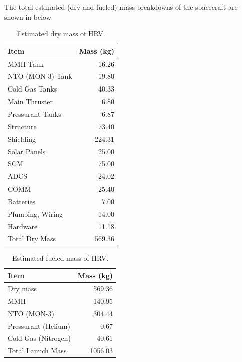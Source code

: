 \documentclass[paper=letter, fontsize=11pt]{scrartcl} %
\numberwithin{equation}{section} %
\numberwithin{figure}{section} %
\numberwithin{table}{section} %
\begin{document}
The total estimated (dry and fueled) mass breakdowns of the spacecraft are shown in below

\begin{table}[H]
  \centering
  \begin{tabular}{l r}
    \toprule
    Item             & Mass (kg) \\
    \midrule
    MMH Tank         & 16.26     \\
    NTO (MON-3) Tank & 19.80     \\
    Cold Gas Tanks   & 40.33     \\
    Main Thruster    & 6.80      \\
    Pressurant Tanks & 6.87      \\
    Structure        & 73.40     \\
    Shielding        & 224.31    \\
    Solar Panels     & 25.00     \\
    SCM              & 75.00     \\
    ADCS             & 24.02     \\
    COMM             & 25.40     \\
    Batteries        & 7.00      \\
    Plumbing, Wiring & 14.00     \\
    Hardware         & 11.18     \\
    \midrule
    Total Dry Mass   & 569.36    \\
    \bottomrule
  \end{tabular}
  \caption{Estimated dry mass of HRV.}
  \label{table:dry_mass}
\end{table}

\begin{table}[H]
  \centering
  \begin{tabular}{l r}
    \toprule
    Item                & Mass (kg) \\
    \midrule
    Dry mass            & 569.36    \\
    MMH                 & 140.95    \\
    NTO (MON-3)         & 304.44    \\
    Pressurant (Helium) & 0.67      \\
    Cold Gas (Nitrogen) & 40.61     \\
    \midrule
    Total Launch Mass   & 1056.03   \\
    \bottomrule
  \end{tabular}
  \caption{Estimated fueled mass of HRV.}
  \label{table:fueled_mass}
\end{table}
\end{document}
